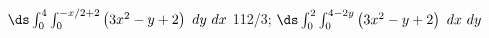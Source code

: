 {$\ds \int_{0}^{4}\int_{0}^{-x/2+2}\left(3x^2-y+2\right)\ dy\ dx$
}
{112/3; $\ds \int_{0}^{2}\int_{0}^{4-2y}\left(3x^2-y+2\right)\ dx\ dy$
}